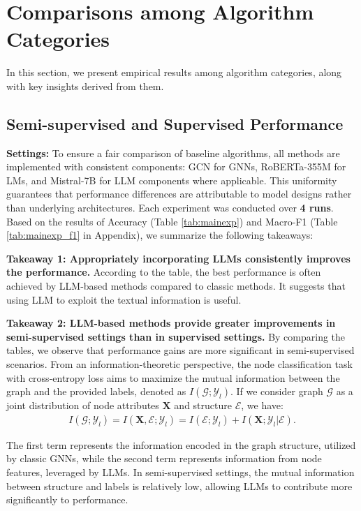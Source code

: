 \section{Comparisons among Algorithm Categories}
In this section, we present empirical results among algorithm categories, along with key insights derived from them.

\subsection{Semi-supervised and Supervised Performance}
\textbf{Settings: }To ensure a fair comparison of baseline algorithms, all methods are implemented with consistent components: GCN \cite{kipf2017GCN} for GNNs, RoBERTa-355M \cite{Liu2019roberta} for LMs, and Mistral-7B \cite{Jiang2023Mistral7B} for LLM components where applicable. This uniformity guarantees that performance differences are attributable to model designs rather than underlying architectures. Each experiment was conducted over \textbf{4 runs}. Based on the results of Accuracy (Table \ref{tab:mainexp}) and Macro-F1 (Table \ref{tab:mainexp_f1} in Appendix), we summarize the following takeaways:

\textbf{Takeaway 1: Appropriately incorporating LLMs consistently improves the performance.} According to the table, the best performance is often achieved by LLM-based methods compared to classic methods. It suggests that using LLM to exploit the textual information is useful. 

\textbf{Takeaway 2: LLM-based methods provide greater improvements in semi-supervised settings than in supervised settings.} By comparing the tables, we observe that performance gains are more significant in semi-supervised scenarios. From an information-theoretic perspective, the node classification task with cross-entropy loss aims to maximize the mutual information between the graph and the provided labels, denoted as $I(\mathcal{G}; \mathcal{Y}_{l})$. If we consider graph $\mathcal{G}$ as a joint distribution of node attributes $\bm{X}$ and structure $\mathcal{E}$, we have: 
\begin{equation}
\label{eq:mutual_info}
    \begin{aligned}
    I(\mathcal{G}; \mathcal{Y}_{l}) = I(\bm{X}, \mathcal{E}; \mathcal{Y}_{l}) = I(\mathcal{E}; \mathcal{Y}_{l}) + I(\bm{X}; \mathcal{Y}_{l} | \mathcal{E}).
\end{aligned}
\end{equation}

The first term represents the information encoded in the graph structure, utilized by classic GNNs, while the second term represents information from node features, leveraged by LLMs. In semi-supervised settings, the mutual information between structure and labels is relatively low, allowing LLMs to contribute more significantly to performance. 

